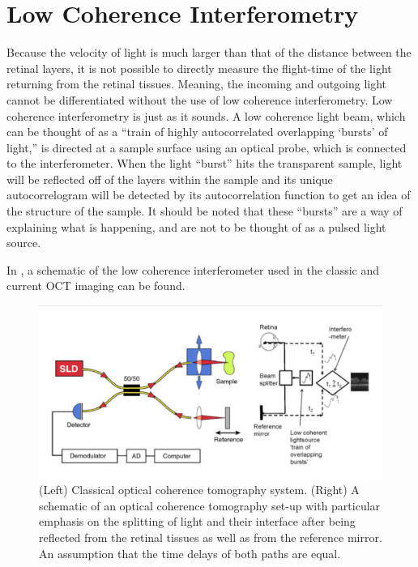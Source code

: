 \section{Low Coherence Interferometry}
Because the velocity of light is much larger than that of the
distance between the retinal layers, it is not possible to
directly measure the flight-time of the light returning from the retinal
tissues. \cite{mbib_5} Meaning, the incoming and outgoing light
cannot be differentiated without
the use of low coherence interferometry. Low coherence interferometry
is just as it sounds.  A low coherence light beam, which can be thought
of as a “train of highly autocorrelated overlapping ‘bursts’ of light,”
is directed at a sample surface using an optical probe, which is connected
to the interferometer.\cite{mbib_4}  When the light “burst” hits the
transparent sample, light will be reflected off of the layers within
the sample and its unique autocorrelogram will be detected by its
autocorrelation function to get an idea of the structure of the sample.
\cite{mbib_4,mbib_3,mbib_6} It should be noted that these “bursts” are a
way of explaining what is happening, and are not to be thought of as a
pulsed light source.

In , a schematic of the low coherence interferometer used in the classic and current OCT imaging can be found.

\begin{figure}[htbp]
\centering
\includegraphics{figures/morgan_1}
\caption{(Left) Classical optical coherence tomography system. 
(Right) A schematic of an optical coherence tomography set-up with particular emphasis on the splitting of light and their interface after being reflected from the retinal tissues as well as from the reference mirror.  An assumption that the time delays of both paths are equal. \cite{mbib_6,mbib_4} }
\label{fig:m_1}
\end{figure}


